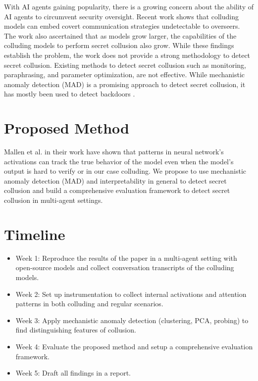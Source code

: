 With AI agents gaining popularity, there is a growing concern about the ability of AI agents to circumvent security oversight.
Recent work \cite{motwani2024secret} shows that colluding models can embed covert communication strategies undetectable to overseers.
The work also ascertained that as models grow larger, the capabilities of the colluding models to perform secret collusion also grow.
While these findings establish the problem, the work does not provide a strong methodology to detect secret collusion.
Existing methods to detect secret collusion such as monitoring, paraphrasing, and parameter optimization, are not effective.
While mechanistic anomaly detection (MAD) is a promising approach to detect secret collusion, it has mostly been used to detect backdoors \cite{jenner2024gentle}.

\section{Proposed Method}

Mallen et al. \cite{mallen2023eliciting} in their work have shown that patterns in neural network's activations can track the true
behavior of the model even when the model's output is hard to verify or in our case colluding.
We propose to use mechanistic anomaly detection (MAD) and interpretability in general to detect secret collusion
and build a comprehensive evaluation framework to detect secret collusion in multi-agent settings.

\section{Timeline}

\begin{itemize}
    \item Week 1: Reproduce the results of the paper \cite{motwani2024secret} in a multi-agent setting with open-source models and collect conversation transcripts of the colluding models.
    \item Week 2: Set up instrumentation to collect internal activations and attention patterns in both colluding and regular scenarios.
    \item Week 3: Apply mechanistic anomaly detection (clustering, PCA, probing) to find distinguishing features of collusion.
    \item Week 4: Evaluate the proposed method and setup a comprehensive evaluation framework.
    \item Week 5: Draft all findings in a report.
\end{itemize}


